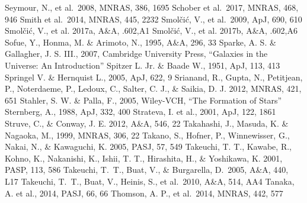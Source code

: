 \begin{thebibliography}{99}
\begin{multicols}{2}
{
    	Seymour, N., et al.\ 2008, MNRAS, 386, 1695
    	Schober et al.\ 2017, MNRAS, 468, 946
    	Smith et al.\ 2014, MNRAS, 445, 2232
    	Smol\v{c}i\'{c}, V., et al.\ 2009, ApJ, 690, 610
    	Smol\v{c}i\'{c}, V., et al.  2017a, A\&A, .602,A1
    	Smol\v{c}i\'{c}, V., et al. 2017b, A\&A, .602,A6
	Sofue, Y., Honma, M. \& Arimoto, N., 1995, A\&A, 296, 33
	Sparke, A. S. \& Gallagher, J. S. III., 2007, Cambridge University Press, 
	``Galaxies in the Universe: An Introduction''
	Spitzer L. Jr. \& Baade W., 1951, ApJ, 113, 413
	Springel V. \& Hernquist L., 2005, ApJ, 622, 9
    	Srianand, R., Gupta, N., Petitjean, P., Noterdaeme, P., Ledoux, C., Salter, C. J.,
    	\& Saikia, D. J. 2012, MNRAS, 421, 651
	Stahler, S. W. \& Palla, F., 2005, Wiley-VCH, ``The Formation of Stars''
      	Sternberg, A., 1988, ApJ, 332, 400
	Strateva, I. et al., 2001, ApJ, 122, 1861
    	Struve, C., \& Conway, J. E. 2012, A\&A, 546, 22
	Takahashi, J., Masuda, K. \& Nagaoka, M., 1999, MNRAS, 306, 22
    	Takano, S., Hofner, P., Winnewisser, G., Nakai, N., \& Kawaguchi, K.
    	2005, PASJ, 57, 549
    	Takeuchi, T. T., Kawabe, R., Kohno, K., Nakanishi, K., Ishii, T. T., Hirashita, H.,
    	\& Yoshikawa, K. 2001, PASP, 113, 586
	Takeuchi, T.~T., Buat, V., \& Burgarella, D.\ 2005, A\&A, 440, L17 
	Takeuchi, T.~T., Buat, V., Heinis, S., et al.\ 2010, A\&A, 514, AA4 
	Tanaka, A. et al., 2014, PASJ, 66, 66
    	Thomson, A. P., et al.\ 2014, MNRAS, 442, 577
}
\end{multicols}
\end{thebibliography}
